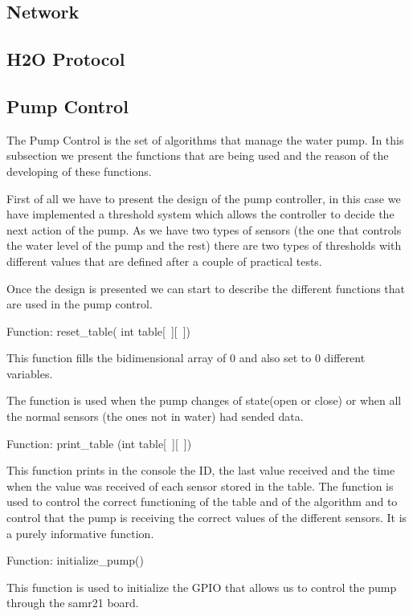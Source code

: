 \documentclass[11pt,paper=a4,parskip=half]{scrartcl}
\begin{document}
\subsection{Network}



\subsection{H2O Protocol}



\subsection{Pump Control}

The Pump Control is the set of algorithms that manage the water pump.
In this subsection we present the functions that are being used and the reason of the developing of these functions.

First of all we have to present the design of the pump controller, in this case we have implemented a threshold system which allows the controller to decide the next action of the pump. As we have two types of sensors (the one that controls the water level of the pump and the rest) there are two types of thresholds with different values that are defined after a couple of practical tests.

Once the design is presented we can start to describe the different functions that are used in the pump control.

Function: reset\_table( int table[~][~])

This function  fills the bidimensional array of 0 and also set to 0 different variables.

The function is used when the pump changes of state(open or close) or when all the normal sensors (the ones not in water) had sended data.

Function: print\_table (int table[~][~])

This function prints in the console the ID, the last value received and the time when the value was received of each sensor stored in the table.
The function is used to control the correct functioning of the table and of the algorithm and to control that the pump is receiving the correct values of the different sensors.
It is a purely informative function.

Function: initialize\_pump()

This function is used to initialize the GPIO that allows us to control the pump through the samr21 board.
\end{document}
